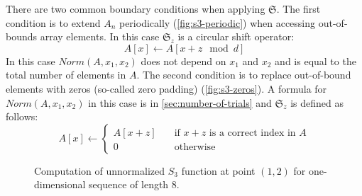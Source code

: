 \documentclass[reprint,amsmath,amssymb,aps,pre,showkeys,showpacs]{revtex4-1}
\begin{document}
There are two common boundary conditions when applying $\mathfrak{S}$. The
first condition is to extend $A_n$ periodically (\cref{fig:s3-periodic}) when
accessing out-of-bounds array elements. In this case $\mathfrak{S}_z$ is a
circular shift operator:
\begin{equation}
  A[x] \leftarrow A[x+z \mod d]
\end{equation}
In this case $Norm(A, x_1, x_2)$ does not depend on $x_1$ and $x_2$ and
is equal to the total number of elements in $A$. The second condition is to
replace out-of-bound elements with zeros (so-called zero padding)
(\cref{fig:s3-zeros}). A formula for $Norm(A, x_1, x_2)$ in this case is in
\ref{sec:number-of-trials} and $\mathfrak{S}_z$ is defined as follows:
\begin{equation}
  A[x] \leftarrow \left\{
  \begin{array}{ll}
    A[x+z] & \quad \text{if $x+z$ is a correct index in $A$} \\
    0 & \quad \text{otherwise}
  \end{array}
  \right.
\end{equation}
\begin{figure}[tp]
  \centering
  \hfill
  \caption[]{Computation of unnormalized $S_3$ function at point $(1, 2)$ for
    one-dimensional sequence of length 8.}
  \label{fig:s3-computation}
\end{figure}
\end{document}
